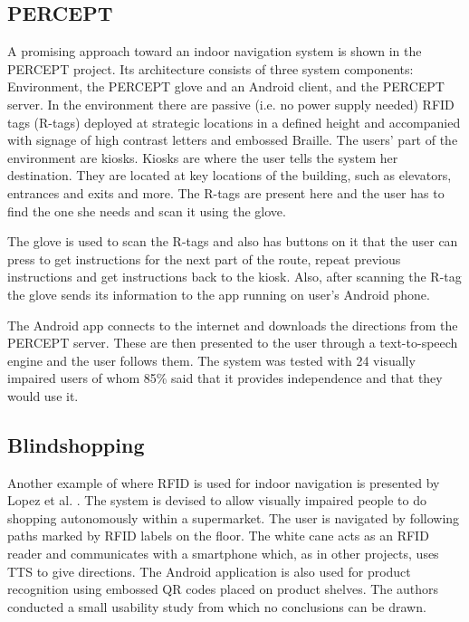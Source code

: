 \subsection{PERCEPT}
A promising approach toward an indoor navigation system is shown in the PERCEPT \cite{percept} project. Its architecture consists of three system components: Environment, the PERCEPT glove and an Android client, and the PERCEPT server. In the environment there are passive (i.e. no power supply needed) RFID tags (R-tags) deployed at strategic locations in a defined height and accompanied with signage of high contrast letters and embossed Braille. The users' part of the environment are kiosks. Kiosks are where the user tells the system her destination. They are located at key locations of the building, such as elevators, entrances and exits and more. The R-tags are present here and the user has to find the one she needs and scan it using the glove.

The glove is used to scan the R-tags and also has buttons on it that the user can press to get instructions for the next part of the route, repeat previous instructions and get instructions back to the kiosk. Also, after scanning the R-tag the glove sends its information to the app running on user's Android phone. 

The Android app connects to the internet and downloads the directions from the PERCEPT server. These are then presented to the user through a text-to-speech engine and the user follows them. The system was tested with 24 visually impaired users of whom 85\% said that it provides independence and that they would use it.

\subsection{Blindshopping}
Another example of where RFID is used for indoor navigation is presented by Lopez et al. \cite{lopez}. The system is devised to allow visually impaired people to do shopping autonomously within a supermarket. The user is navigated by following paths marked by RFID labels on the floor. The white cane acts as an RFID reader and communicates with a smartphone which, as in other projects, uses TTS to give directions. The Android application is also used for product recognition using embossed QR codes placed on product shelves. The authors conducted a small usability study from which no conclusions can be drawn.

